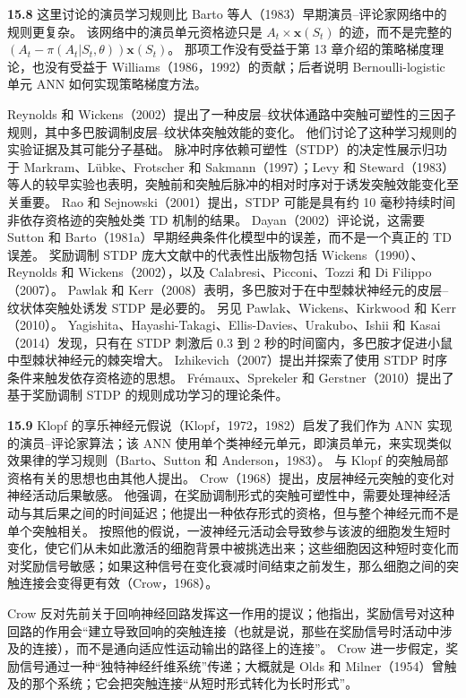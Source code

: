 \documentclass[UTF8, 12pt, fontset=fandol, oneside]{ctexart}
\begin{document}
\noindent\textbf{15.8}
这里讨论的演员学习规则比 Barto 等人（1983）早期演员--评论家网络中的规则更复杂。
该网络中的演员单元资格迹只是 $A_t\times\mathbf{x}(S_t)$ 的迹，而不是完整的 $(A_t-\pi(A_t|S_t,\theta))\mathbf{x}(S_t)$。
那项工作没有受益于第 13 章介绍的策略梯度理论，也没有受益于 Williams（1986，1992）的贡献；后者说明 Bernoulli-logistic 单元 ANN 如何实现策略梯度方法。

Reynolds 和 Wickens（2002）提出了一种皮层--纹状体通路中突触可塑性的三因子规则，其中多巴胺调制皮层--纹状体突触效能的变化。
他们讨论了这种学习规则的实验证据及其可能分子基础。
脉冲时序依赖可塑性（STDP）的决定性展示归功于 Markram、Lübke、Frotscher 和 Sakmann（1997）；Levy 和 Steward（1983）等人的较早实验也表明，突触前和突触后脉冲的相对时序对于诱发突触效能变化至关重要。
Rao 和 Sejnowski（2001）提出，STDP 可能是具有约 10 毫秒持续时间非依存资格迹的突触处类 TD 机制的结果。
Dayan（2002）评论说，这需要 Sutton 和 Barto（1981a）早期经典条件化模型中的误差，而不是一个真正的 TD 误差。
奖励调制 STDP 庞大文献中的代表性出版物包括 Wickens（1990）、Reynolds 和 Wickens（2002），以及 Calabresi、Picconi、Tozzi 和 Di Filippo（2007）。
Pawlak 和 Kerr（2008）表明，多巴胺对于在中型棘状神经元的皮层--纹状体突触处诱发 STDP 是必要的。
另见 Pawlak、Wickens、Kirkwood 和 Kerr（2010）。
Yagishita、Hayashi-Takagi、Ellis-Davies、Urakubo、Ishii 和 Kasai（2014）发现，只有在 STDP 刺激后 0.3 到 2 秒的时间窗内，多巴胺才促进小鼠中型棘状神经元的棘突增大。
Izhikevich（2007）提出并探索了使用 STDP 时序条件来触发依存资格迹的思想。
Frémaux、Sprekeler 和 Gerstner（2010）提出了基于奖励调制 STDP 的规则成功学习的理论条件。

\noindent\textbf{15.9}
Klopf 的享乐神经元假说（Klopf，1972，1982）启发了我们作为 ANN 实现的演员--评论家算法；该 ANN 使用单个类神经元单元，即演员单元，来实现类似效果律的学习规则（Barto、Sutton 和 Anderson，1983）。
与 Klopf 的突触局部资格有关的思想也由其他人提出。
Crow（1968）提出，皮层神经元突触的变化对神经活动后果敏感。
他强调，在奖励调制形式的突触可塑性中，需要处理神经活动与其后果之间的时间延迟；他提出一种依存形式的资格，但与整个神经元而不是单个突触相关。
按照他的假说，一波神经元活动会导致参与该波的细胞发生短时变化，使它们从未如此激活的细胞背景中被挑选出来；这些细胞因这种短时变化而对奖励信号敏感；如果这种信号在变化衰减时间结束之前发生，那么细胞之间的突触连接会变得更有效（Crow，1968）。

Crow 反对先前关于回响神经回路发挥这一作用的提议；他指出，奖励信号对这种回路的作用会“建立导致回响的突触连接（也就是说，那些在奖励信号时活动中涉及的连接），而不是通向适应性运动输出的路径上的连接”。
Crow 进一步假定，奖励信号通过一种“独特神经纤维系统”传递；大概就是 Olds 和 Milner（1954）曾触及的那个系统；它会把突触连接“从短时形式转化为长时形式”。
\end{document}
